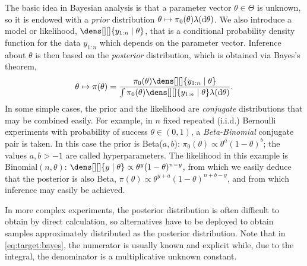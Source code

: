 \documentclass[english,graybox,envcountchap,envcountsame,sectrefs,shortlabels]{svmono}
\theoremstyle{style}
\begin{document}
The basic idea in Bayesian analysis is that a parameter vector $ \theta \in \Theta$ is unknown, so it is endowed with a \emph{prior} distribution
$\theta\mapsto \pi_0( \theta)\lambda(\mathrm{d} \theta)$.  We also
introduce a model or likelihood, $\dens[][]{ y_{1:n} \mid \theta}$, that is
a conditional probability density function for the data $y_{1:n}$ which depends on the parameter vector.
Inference about $ \theta$ is then based on the \emph{posterior}
distribution, which is obtained via Bayes's theorem,
\begin{equation} \label{eq:target:bayes}
\theta \mapsto \pi(\theta) =\frac{\pi_0( \theta) \dens[][]{ y_{1:n} \mid \theta}}{\int \pi_0( \theta) \dens[][]{ y_{1:n} \mid \theta} \lambda(\rmd \theta)}.
\end{equation}
  In some simple cases, the prior  and
the likelihood are \emph{conjugate}  distributions that may be combined easily.
For example, in $n$ fixed repeated (i.i.d.) Bernoulli experiments with probability of success $\theta\in(0,1)$,
a \emph{Beta-Binomial} conjugate pair is taken.  In this case the prior is
Beta($a,b$):
$\pi_0(\theta) \propto \theta^{a} (1-\theta)^{b}$; the values $a,b > -1$  are called
hyperparameters. The likelihood in this example is
Binomial$(n,\theta)$:
$\dens[][]{ y \mid \theta} \propto \theta^y (1-\theta)^{n-y}$, from which
we easily deduce that the
posterior is also Beta,
$\pi ( \theta ) \propto \theta^{y+a}(1-\theta)^{n+b-y }
$, and from which inference may easily be achieved.

In more complex experiments, the posterior distribution is often difficult to obtain by direct calculation,
so alternatives have to be deployed to obtain samples approximately distributed as the posterior distribution. Note that in \eqref{eq:target:bayes}, the numerator is usually known and explicit while, due to the integral, the denominator is a multiplicative unknown constant.  
\end{document}
